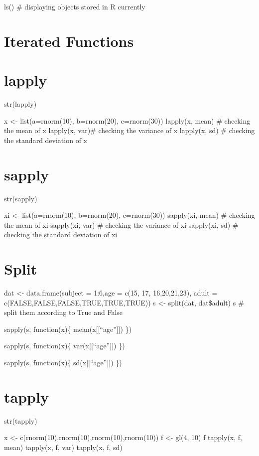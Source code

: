 \documentclass[
]{article}
\begin{document}
ls() \# displaying objects stored in R currently

\section{Iterated Functions}\label{iterated-functions}

\section{lapply}\label{lapply}

str(lapply)

x \textless- list(a=rnorm(10), b=rnorm(20), c=rnorm(30)) lapply(x, mean)
\# checking the mean of x lapply(x, var)\# checking the variance of x
lapply(x, sd) \# checking the standard deviation of x

\section{sapply}\label{sapply}

str(sapply)

xi \textless- list(a=rnorm(10), b=rnorm(20), c=rnorm(30)) sapply(xi,
mean) \# checking the mean of xi sapply(xi, var) \# checking the
variance of xi sapply(xi, sd) \# checking the standard deviation of xi

\section{Split}\label{split}

dat \textless- data.frame(subject = 1:6,age = c(15, 17, 16,20,21,23),
adult = c(FALSE,FALSE,FALSE,TRUE,TRUE,TRUE)) s \textless- split(dat,
dat\$adult) s \# split them according to True and False

sapply(s, function(x)\{ mean(x{[}{[}``age''{]}{]}) \})

sapply(s, function(x)\{ var(x{[}{[}``age''{]}{]}) \})

sapply(s, function(x)\{ sd(x{[}{[}``age''{]}{]}) \})

\section{tapply}\label{tapply}

str(tapply)

x \textless- c(rnorm(10),rnorm(10),rnorm(10),rnorm(10)) f \textless-
gl(4, 10) f tapply(x, f, mean) tapply(x, f, var) tapply(x, f, sd)
\end{document}
